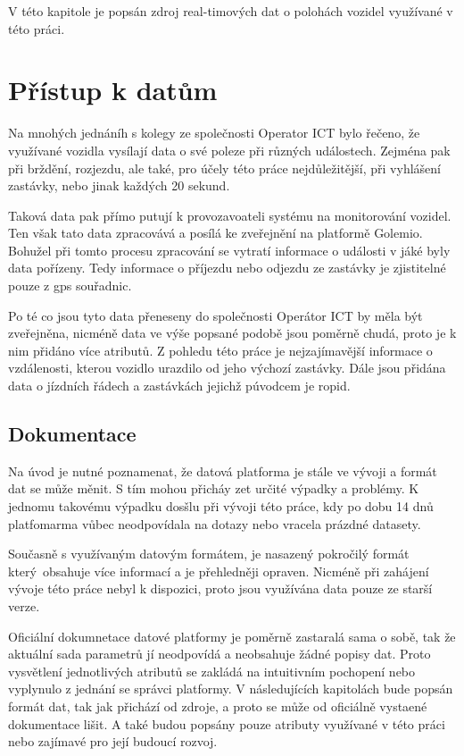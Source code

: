 
V této kapitole je popsán zdroj real-timových dat o polohách vozidel využívané v této práci.

\section{Přístup k datům}

Na mnohých jednáníh s kolegy ze společnosti Operator ICT bylo řečeno, že využívané vozidla vysílají data o své poleze při různých událostech. Zejména pak při brždění, rozjezdu, ale také, pro účely této práce nejdůležitější, při vyhlášení zastávky, nebo jinak každých 20 sekund.

\bigbreak

Taková data pak přímo putují k provozavoateli systému na monitorování vozidel. Ten však tato data zpracovává a posílá ke zveřejnění na platformě Golemio. Bohužel při tomto procesu zpracování se vytratí informace o události v jáké byly data pořízeny. Tedy informace o příjezdu nebo odjezdu ze zastávky je zjistitelné pouze z \gls{gps} souřadnic.

\bigbreak

Po té co jsou tyto data přeneseny do společnosti Operátor ICT by měla být zveřejněna, nicméně data ve výše popsané podobě jsou poměrně chudá, proto je k nim přidáno více atributů. Z pohledu této práce je nejzajímavější informace o vzdálenosti, kterou vozidlo urazdilo od jeho výchozí zastávky. Dále jsou přidána data o jízdních řádech a zastávkách jejichž púvodcem je \gls{ropid}.

\subsection{Dokumentace}

Na úvod je nutné poznamenat, že datová platforma je stále ve vývoji a formát dat se může měnit. S tím mohou přicháy zet určité výpadky a problémy. K jednomu takovému výpadku dosšlu při vývoji této práce, kdy po dobu 14 dnů platfomarma vůbec neodpovídala na dotazy nebo vracela prázdné datasety.

\bigbreak

Současně s využívaným datovým formátem, je nasazený pokročilý formát který obsahuje více informací a je přehledněji opraven. Nicméně při zahájení vývoje této práce nebyl k dispozici, proto jsou využívána data pouze ze starší verze.

\bigbreak

Oficiální dokumnetace datové platformy je poměrně zastaralá sama o sobě, tak že aktuální sada parametrů jí neodpovídá a neobsahuje žádné popisy dat. Proto vysvětlení jednotlivých atributů se zakládá na intuitivním pochopení nebo vyplynulo z jednání se správci platformy. V následujících kapitolách bude popsán formát dat, tak jak přichází od zdroje, a proto se může od oficiálně vystaené dokumentace lišit. A také budou popsány pouze atributy využívané v této práci nebo zajímavé pro její budoucí rozvoj.

